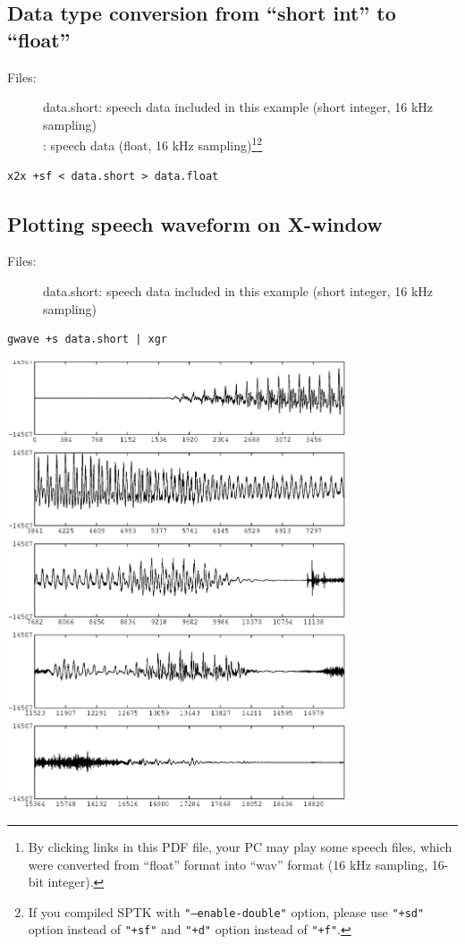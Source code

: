 \documentclass[a4paper,10pt]{article}
\begin{document}
\subsection{Data type conversion from ``short int'' to ``float''}

\begin{description}
\item[Files:]
  data.short: speech data included in this example (short integer, 16 kHz sampling)\\
  :
  speech data (float, 16 kHz sampling)\footnote{By clicking links in this PDF file, your PC may play some speech files, which
were converted from ``float'' format into ``wav'' format
(16 kHz sampling, 16-bit integer).}\footnote{If you compiled SPTK with
\texttt{"--enable-double"} option, please use \texttt{"+sd"} option instead
of \texttt{"+sf"} and \texttt{"+d"} option instead
of \texttt{"+f"}.}\\
\end{description}

\begin{verbatim}
x2x +sf < data.short > data.float
\end{verbatim}

\subsection{Plotting speech waveform on X-window}

\begin{description}
\item[Files:]
  data.short: speech data included in this example (short integer, 16 kHz sampling)
\end{description}

\begin{verbatim}
gwave +s data.short | xgr
\end{verbatim}

\includegraphics[width=10cm]{eps/data.gwave.eps}
\end{document}
